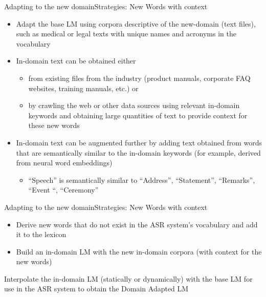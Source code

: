 \begin{frame}{Adapting to the new domain}{Strategies: New Words with context}

\begin{itemize}
\item Adapt the base LM using  corpora descriptive of the new-domain (text files), such as medical or legal texts with unique names and acronyms in the vocabulary
\item  In-domain text can be obtained either
\begin{itemize}
\item from existing files from the industry (product manuals, corporate FAQ websites, training manuals, etc.) or
\item by crawling the web or other data sources using relevant {\color{red} in-domain keywords} and obtaining large quantities of text to provide context for these new words
\end{itemize}
\item In-domain text can be augmented further by adding text obtained from words that are semantically similar to the in-domain keywords (for example, derived from neural word embeddings)
\begin{itemize}
\item {\color{blue} ``Speech''} is semantically similar to ``Address'', ``Statement'', ``Remarks'', ``Event ``, ``Ceremony''
\end{itemize}
\end{itemize}

\end{frame}

\begin{frame}{Adapting to the new domain}{Strategies: New Words with context}
\begin{itemize}
\item Derive new words that do not exist in the ASR system's vocabulary and add it to the lexicon 
\item Build an {\color{blue} in-domain LM} with the new in-domain corpora (with context for the new words) 
\end{itemize}

Interpolate the in-domain LM (statically or dynamically) with the base LM for use in the ASR system to obtain  the {\color{red} Domain Adapted LM}

\end{frame}

